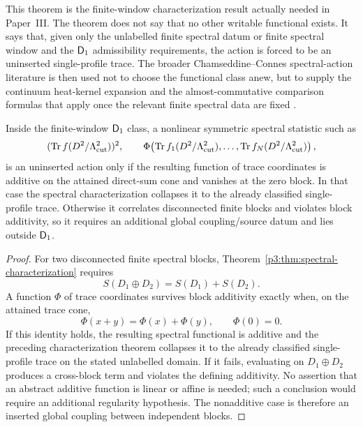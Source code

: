 \documentclass[12pt,a4paper]{article}
\begin{document}
\begin{remark}
This theorem is the finite-window characterization result actually needed in
Paper~III.  The theorem does not say that no other writable functional exists.  It says
that, given only the unlabelled finite spectral datum or finite spectral window and the \(\mathsf{D}_1\) admissibility
requirements, the action is forced to be an uninserted single-profile trace.  The broader
Chamseddine--Connes spectral-action literature is then used not to choose the functional
class anew, but to supply the continuum heat-kernel expansion and the almost-commutative
comparison formulas that apply once the relevant finite spectral data are fixed
\cite{ChamseddineConnes1997,Connes1996,GraciaBondia2001,ChamseddineConnesvanSuijlekom2020Entropy}.
\end{remark}

\begin{corollary}
\label{p3:cor:no-multitrace-finite-datum}
Inside the finite-window \(\mathsf{D}_1\) class, a nonlinear symmetric spectral statistic such as
\[
        (\operatorname{Tr} f(D^2/\Lambda_{\mathrm{cut}}^2))^2,
        \qquad
        \Phi\!\left(\operatorname{Tr} f_1(D^2/\Lambda_{\mathrm{cut}}^2),\ldots,\operatorname{Tr} f_N(D^2/\Lambda_{\mathrm{cut}}^2)\right),
\]
is an uninserted action only if the resulting function of trace coordinates is
additive on the attained direct-sum cone and vanishes at the zero block.  In
that case the spectral characterization collapses it to the already classified
single-profile trace.  Otherwise it correlates disconnected finite blocks and
violates block additivity, so it requires an additional global
coupling/source datum and lies outside \(\mathsf{D}_1\).
\end{corollary}

\begin{proof}
For two disconnected finite spectral blocks, Theorem~\ref{p3:thm:spectral-characterization} requires
\[
        S(D_1\oplus D_2)=S(D_1)+S(D_2).
\]
A function \(\Phi\) of trace coordinates survives block additivity exactly
when, on the attained trace cone,
\[
 \Phi(x+y)=\Phi(x)+\Phi(y),\qquad \Phi(0)=0.
\]
If this identity holds, the resulting spectral functional is additive and the
preceding characterization theorem collapses it to the already classified
single-profile trace on the stated unlabelled domain.  If it fails, evaluating
on \(D_1\oplus D_2\) produces a cross-block term and violates the defining
additivity.  No assertion that an abstract additive function is linear or
affine is needed; such a conclusion would require an additional regularity
hypothesis.  The nonadditive case is therefore an inserted global coupling
between independent blocks.
\end{proof}
\end{document}

